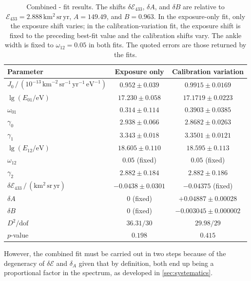 \documentclass[main.tex]{subfiles}
\begin{document}
\begin{table}
    \centering
    \caption{Combined - fit results. The shifts $\delta\mathcal E_{433}$, $\delta A$, and $\delta B$ are relative to $\mathcal E_{433}=2.888\,\mathrm{km^2\,sr\,yr}$, $A=149.49$, and $B=0.963$. In the exposure-only fit, only the exposure shift varies; in the calibration-variation fit, the exposure shift is fixed to the preceding best-fit value and the calibration shifts vary. The ankle width is fixed to $\omega_{12}=0.05$ in both fits. The quoted errors are those returned by the fits.}
    \label{table:combined_parameters_single}
    \begin{tabular}{lcc}
        \toprule
        Parameter & Exposure only & Calibration variation\\
        \midrule
        $J_0\,/\,(10^{-13}\,\mathrm{km}^{-2}\,\mathrm{sr}^{-1}\,\mathrm{yr}^{-1}\,\mathrm{eV}^{-1})$ & $0.952\pm0.039$ & $0.9915\pm0.0169$\\
        $\lg(E_{01}/\mathrm{eV})$ & $17.230\pm0.058$ & $17.1719\pm0.0223$\\
        $\omega_{01}$ & $0.314\pm0.114$ & $0.3903\pm0.0385$\\
        $\gamma_0$ & $2.938\pm0.066$ & $2.8682\pm0.0263$\\
        $\gamma_1$ & $3.343\pm0.018$ & $3.3501\pm0.0121$\\
        $\lg(E_{12}/\mathrm{eV})$ & $18.605\pm0.110$ & $18.595\pm0.113$\\
        $\omega_{12}$ & $0.05$ (fixed) & $0.05$ (fixed)\\
        $\gamma_2$ & $2.882\pm0.184$ & $2.882\pm0.186$\\
        \midrule
        $\delta\mathcal E_{433}\,/\,(\mathrm{km^2\,sr\,yr})$ & $-0.0438\pm0.0301$ & $-0.04375$ (fixed)\\
        $\delta A$ & $0$ (fixed) & $+0.04887\pm0.00028$\\
        $\delta B$ & $0$ (fixed) & $-0.003045\pm0.000002$\\
        \midrule
        $D^2/\mathrm{dof}$ & $36.31/30$ & $29.98/29$\\
        $p$-value & $0.198$ & $0.415$\\
        \bottomrule
    \end{tabular}
\end{table}
However, the combined fit must be carried out in two steps because of the degeneracy of $\delta\mathcal{E}$ and $\delta_A$ given that by definition, both end up being a proportional factor in the spectrum, as developed in \cref{sec:systematics}.
\end{document}
